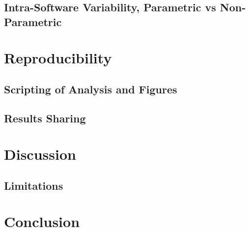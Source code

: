 \subsection{Intra-Software Variability, Parametric vs Non-Parametric}

\section{Reproducibility}

\subsection{Scripting of Analysis and Figures}

\subsection{Results Sharing}

\section{Discussion}

\subsection{Limitations}

\section{Conclusion}
